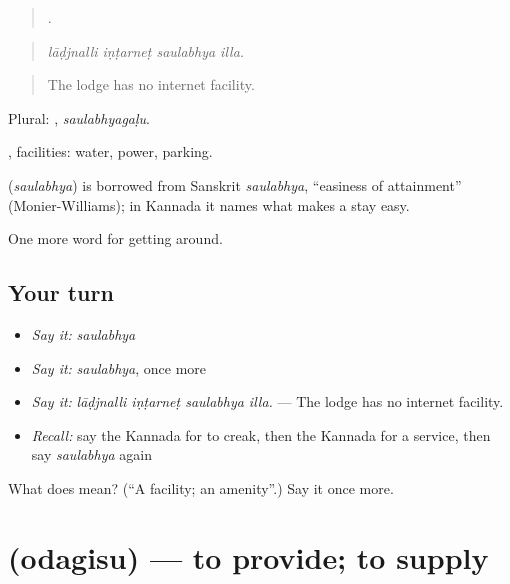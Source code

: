 \begin{quote}
   .
\end{quote}

\begin{quote}
\emph{lāḍjnalli iṇṭarneṭ saulabhya illa.}
\end{quote}

\begin{quote}
The lodge has no internet facility.
\end{quote}

Plural: , \emph{saulabhyagaḷu}.

, facilities: water, power, parking.

\begin{cousinweb}
\textbf{} (\emph{saulabhya}) is borrowed from Sanskrit \emph{saulabhya}, \textquotedblleft{}easiness of attainment\textquotedblright{} (Monier-Williams); in Kannada it names what makes a stay easy.
\end{cousinweb}

\begin{grammarlens}[title={What you've built}]
One more word for getting around.
\end{grammarlens}

\subsection*{Your turn}
\begin{itemize}
\raggedright
  \item \emph{Say it:} \emph{saulabhya}
  \item \emph{Say it:} \emph{saulabhya}, once more
  \item \emph{Say it:} \emph{lāḍjnalli iṇṭarneṭ saulabhya illa.} — The lodge has no internet facility.
  \item \emph{Recall:} say the Kannada for to creak, then the Kannada for a service, then say \emph{saulabhya} again
\end{itemize}

\begin{tcolorbox}[breakable,colback=teal!4,colframe=teal!35!black,title={Before you move on}]
What does  mean? (\textquotedblleft{}A facility; an amenity\textquotedblright{}.) Say it once more.
\end{tcolorbox}
\section[\texorpdfstring{\kn{ಒದಗಿಸು} (odagisu)}{ಒದಗಿಸು (odagisu)}]{ (odagisu) — to provide; to supply}

